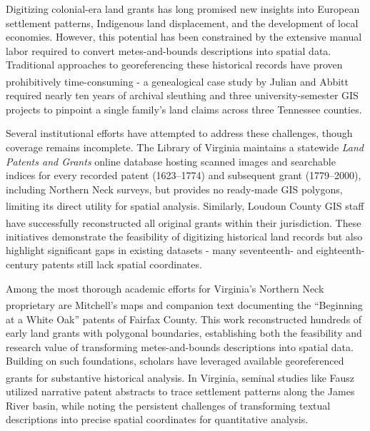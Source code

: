 \documentclass[
  10pt,
  twocolumn]{article}
\begin{document}
Digitizing colonial-era land grants has long promised new insights into
European settlement patterns, Indigenous land displacement, and the
development of local economies. However, this potential has been
constrained by the extensive manual labor required to convert
metes-and-bounds descriptions into spatial data. Traditional approaches
to georeferencing these historical records have proven prohibitively
time-consuming - a genealogical case study by Julian and
Abbitt\textsuperscript{} required
nearly ten years of archival sleuthing and three university-semester GIS
projects to pinpoint a single family's land claims across three
Tennessee counties.

Several institutional efforts have attempted to address these
challenges, though coverage remains incomplete. The Library of Virginia
maintains a statewide \emph{Land Patents and Grants} online database
hosting scanned images and searchable indices for every recorded patent
(1623--1774) and subsequent grant (1779--2000), including Northern Neck
surveys, but provides no ready-made GIS polygons, limiting its direct
utility for spatial
analysis\textsuperscript{}. Similarly,
Loudoun County GIS staff have successfully reconstructed all original
grants within their
jurisdiction\textsuperscript{}.
These initiatives demonstrate the feasibility of digitizing historical
land records but also highlight significant gaps in existing datasets -
many seventeenth- and eighteenth-century patents still lack spatial
coordinates.

Among the most thorough academic efforts for Virginia's Northern Neck
proprietary are
Mitchell's\textsuperscript{} maps
and companion text documenting the ``Beginning at a White Oak'' patents
of Fairfax County. This work reconstructed hundreds of early land grants
with polygonal boundaries, establishing both the feasibility and
research value of transforming metes-and-bounds descriptions into
spatial data. Building on such foundations, scholars have leveraged
available georeferenced grants for substantive historical analysis. In
Virginia, seminal studies like
Fausz\textsuperscript{} utilized
narrative patent abstracts to trace settlement patterns along the James
River basin, while noting the persistent challenges of transforming
textual descriptions into precise spatial coordinates for quantitative
analysis.
\end{document}

